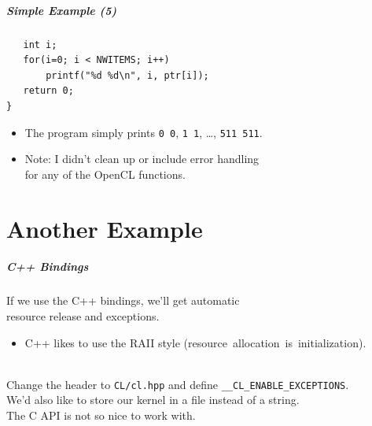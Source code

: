 \begin{frame}[fragile]
  \frametitle{Simple Example (5)}



  \begin{lstlisting}
   int i;
   for(i=0; i < NWITEMS; i++)
       printf("%d %d\n", i, ptr[i]);
   return 0;
}
  \end{lstlisting}

  \begin{itemize}
    \item The program simply prints {\tt 0 0}, {\tt 1 1}, \ldots, {\tt 511 511}.
    \item Note: I didn't clean up or include error handling\\ for any of the
      OpenCL functions.
  \end{itemize}

\end{frame}

\part{Another Example}
\frame{\partpage}

\begin{frame}
  \frametitle{C++ Bindings}


    If we use the C++ bindings, we'll get automatic \\ resource release and
      exceptions.
      \begin{itemize}
        \item C++ likes to use the RAII style
          (resource~allocation~is~initialization).
      \end{itemize}~\\
    Change the header to {\tt CL/cl.hpp} and define
      {\tt \_\_CL\_ENABLE\_EXCEPTIONS}.\\[.5em]
    We'd also like to store our kernel in a file instead of a string.\\[.5em]
    The C API is not so nice to work with.

\end{frame}

